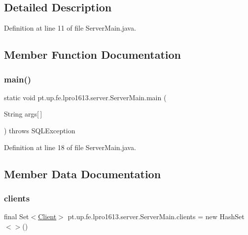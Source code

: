 \subsection{Detailed Description}


Definition at line 11 of file Server\+Main.\+java.



\subsection{Member Function Documentation}
\hypertarget{classpt_1_1up_1_1fe_1_1lpro1613_1_1server_1_1_server_main_aa3501ccad0bb4a2f62168d8f84b12021}{}\label{classpt_1_1up_1_1fe_1_1lpro1613_1_1server_1_1_server_main_aa3501ccad0bb4a2f62168d8f84b12021} 
\subsubsection{\texorpdfstring{main()}{main()}}
{\footnotesize\ttfamily static void pt.\+up.\+fe.\+lpro1613.\+server.\+Server\+Main.\+main (\begin{DoxyParamCaption}\item[{String}]{args\mbox{[}$\,$\mbox{]} }\end{DoxyParamCaption}) throws S\+Q\+L\+Exception\hspace{0.3cm}{\ttfamily [static]}}



Definition at line 18 of file Server\+Main.\+java.



\subsection{Member Data Documentation}
\hypertarget{classpt_1_1up_1_1fe_1_1lpro1613_1_1server_1_1_server_main_ad123167652dd573c163e4951b9eeada9}{}\label{classpt_1_1up_1_1fe_1_1lpro1613_1_1server_1_1_server_main_ad123167652dd573c163e4951b9eeada9} 
\subsubsection{\texorpdfstring{clients}{clients}}
{\footnotesize\ttfamily final Set$<$\hyperlink{classpt_1_1up_1_1fe_1_1lpro1613_1_1server_1_1conn_1_1_client}{Client}$>$ pt.\+up.\+fe.\+lpro1613.\+server.\+Server\+Main.\+clients = new Hash\+Set$<$$>$()\hspace{0.3cm}{\ttfamily [static]}}



